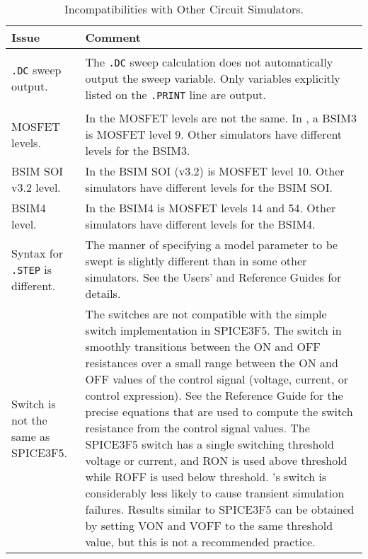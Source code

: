


\begin{longtable}[h] {>{\raggedright\small}m{2in}|>{\raggedright\let\\\tabularnewline\small}m{3.5in}}
  \caption{Incompatibilities with Other Circuit Simulators.} \\ \hline
  \rowcolor{XyceDarkBlue}
  \color{white}\bf Issue &
  \color{white}\bf Comment \\ \hline \endfirsthead
  \label{Incompat_Other_SPICE}

    \texttt{.DC} sweep output. & The \texttt{.DC} sweep calculation does not
    automatically output the sweep variable.  Only variables explicitly listed on
    the \texttt{.PRINT} line are output.\\ \hline

    MOSFET levels. & In \Xyce{} the MOSFET levels are not the same. In \Xyce{},
    a BSIM3 is MOSFET level 9.  Other simulators have different levels for the 
    BSIM3. \\ \hline

    BSIM SOI v3.2 level. & In \Xyce{} the BSIM SOI (v3.2) is MOSFET level 10.  
    Other simulators have different levels for the BSIM SOI. \\ \hline

    BSIM4 level. & In \Xyce{} the BSIM4 is MOSFET levels 14 and 54.  
    Other simulators have different levels for the BSIM4. \\ \hline

    Syntax for \texttt{.STEP} is different. & The manner of specifying
    a model parameter to be swept is slightly different than in some
    other simulators.  See the \Xyce{} Users' and Reference Guides for
    details.  \\ \hline

    Switch is not the same as SPICE3F5. &  The \Xyce{} switches are not
    compatible with the simple switch implementation in SPICE3F5.  The
    switch in \Xyce{} smoothly transitions between the ON and OFF
    resistances over a small range between the ON and OFF values of the
    control signal (voltage, current, or control expression).  See the
    \Xyce{} Reference Guide for the precise equations that are used to compute the
    switch resistance from the control signal values.  The SPICE3F5 switch
    has a single switching threshold voltage or current, and RON is used
    above threshold while ROFF is used below threshold.  \Xyce{}'s switch is
    considerably less likely to cause transient simulation failures. Results
    similar to SPICE3F5 can be obtained by setting VON and VOFF to the same
    threshold value, but this is not a recommended practice.  \\ \hline


\end{longtable}
